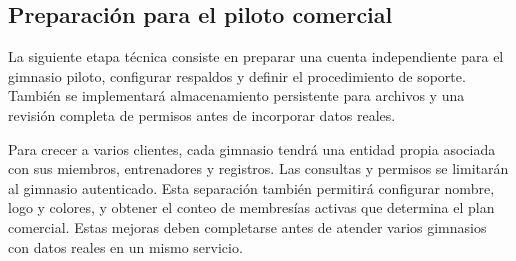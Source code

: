 \subsection{Preparación para el piloto comercial}

La siguiente etapa técnica consiste en preparar una cuenta independiente para el
gimnasio piloto, configurar respaldos y
definir el procedimiento de soporte. También se implementará almacenamiento
persistente para archivos y una revisión completa de permisos antes de incorporar
datos reales.

Para crecer a varios clientes, cada gimnasio tendrá una entidad propia asociada
con sus miembros, entrenadores y registros. Las consultas y
permisos se limitarán al gimnasio autenticado. Esta separación también permitirá
configurar nombre, logo y colores, y obtener el conteo de membresías activas que
determina el plan comercial. Estas mejoras deben completarse antes de atender
varios gimnasios con datos reales en un mismo servicio.
